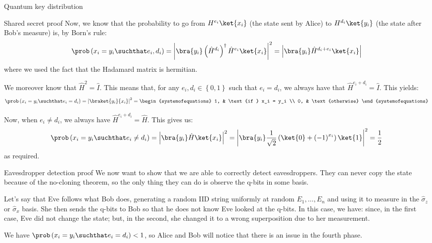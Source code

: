 \documentclass[a4paper]{article}
\begin{document}
\begin{parag}{Quantum key distribution}
\begin{subparag}{Shared secret proof}
        Now, we know that the probability to go from $H^{e_i} \ket{x_i}$ (the state sent by Alice) to $H^{d_i}\ket{y_i}$ (the state after Bob's measure) is, by Born's rule: 
        \[\prob\left(x_i = y_i \suchthat e_i, d_i\right) = \left|\bra{y_i} \left(\hat{H}^{d_i}\right)^{\dagger} \hat{H}^{e_i} \ket{x_i}\right|^2 = \left|\bra{y_i} \hat{H}^{d_i + e_i} \ket{x_i}\right| \]
        where we used the fact that the Hadamard matrix is hermitian.

        We moreover know that $\hat{H}^2 = \hat{I}$. This means that, for any $e_i, d_i \in \left\{0, 1\right\}$ such that $e_i = d_i$, we always have that $\hat{H}^{e_i + d_i} = \hat{I}$. This yields: 
        \[\prob\left(x_i = y_i \suchthat e_i = d_i\right) = \left|\braket{y_i}{x_i}\right|^2 = \begin{systemofequations} 1, & \text{if } x_i = y_i \\ 0, & \text{otherwise} \end{systemofequations}\]
        
        Now, when $e_i \neq d_i$, we always have $\hat{H}^{e_i + d_i} = \hat{H}$. This gives us: 
        \[\prob\left(x_i = y_i \suchthat e_i \neq d_i\right) = \left|\bra{y_i}\hat{H}\ket{x_i}\right|^2 = \left|\bra{y_i} \frac{1}{\sqrt{2}}\left(\ket{0} + \left(-1\right)^{x_i}\right)\ket{1}\right|^2 = \frac{1}{2}\]
        as required.
    \end{subparag}

    \begin{subparag}{Eavesdropper detection proof}
        We now want to show that we are able to correctly detect eavesdroppers. They can never copy the state because of the no-cloning theorem, so the only thing they can do is observe the q-bits in some basis. 

        Let's say that Eve follows what Bob does, generating a random IID string uniformly at random $E_1, \ldots, E_n$ and using it to measure in the $\hat{\sigma}_z$ or $\hat{\sigma}_x$ basis. She then sends the q-bits to Bob so that he does not know Eve looked at the q-bits. In this case, we have: 
        since, in the first case, Eve did not change the state; but, in the second, she changed it to a wrong superposition due to her measurement. 

        We have $\prob\left(x_i = y_i \suchthat e_i = d_i\right) < 1$, so Alice and Bob will notice that there is an issue in the fourth phase.
    \end{subparag}
\end{parag}
\end{document}
